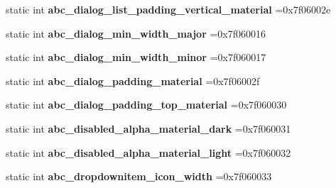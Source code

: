 \begin{DoxyCompactItemize}
static int {\bfseries abc\+\_\+dialog\+\_\+list\+\_\+padding\+\_\+vertical\+\_\+material} =0x7f06002e
\item 
\mbox{\label{classandroid_1_1support_1_1v7_1_1cardview_1_1R_1_1dimen_ae60320985e37c6bcba009cfd2840dda7}} 
static int {\bfseries abc\+\_\+dialog\+\_\+min\+\_\+width\+\_\+major} =0x7f060016
\item 
\mbox{\label{classandroid_1_1support_1_1v7_1_1cardview_1_1R_1_1dimen_a37981ce71689dfaf7d886c3584b90f11}} 
static int {\bfseries abc\+\_\+dialog\+\_\+min\+\_\+width\+\_\+minor} =0x7f060017
\item 
\mbox{\label{classandroid_1_1support_1_1v7_1_1cardview_1_1R_1_1dimen_a5877ec45a2d6208d8321fbb514e4f2f1}} 
static int {\bfseries abc\+\_\+dialog\+\_\+padding\+\_\+material} =0x7f06002f
\item 
\mbox{\label{classandroid_1_1support_1_1v7_1_1cardview_1_1R_1_1dimen_a5a55444486c5642b252ef1237111c751}} 
static int {\bfseries abc\+\_\+dialog\+\_\+padding\+\_\+top\+\_\+material} =0x7f060030
\item 
\mbox{\label{classandroid_1_1support_1_1v7_1_1cardview_1_1R_1_1dimen_ac5cc09b7cbd3fe0f0fa6fb9b6a07e929}} 
static int {\bfseries abc\+\_\+disabled\+\_\+alpha\+\_\+material\+\_\+dark} =0x7f060031
\item 
\mbox{\label{classandroid_1_1support_1_1v7_1_1cardview_1_1R_1_1dimen_addbc89f031e03ce206435073aea7a0bb}} 
static int {\bfseries abc\+\_\+disabled\+\_\+alpha\+\_\+material\+\_\+light} =0x7f060032
\item 
\mbox{\label{classandroid_1_1support_1_1v7_1_1cardview_1_1R_1_1dimen_a19ff28f391a6c332e36a0ce0f4d15ea6}} 
static int {\bfseries abc\+\_\+dropdownitem\+\_\+icon\+\_\+width} =0x7f060033
\item 
\mbox{\label{classandroid_1_1support_1_1v7_1_1cardview_1_1R_1_1dimen_adf4dd92b7a5cd3fdb626f5330eb9b3d9}} 

\end{DoxyCompactItemize}
